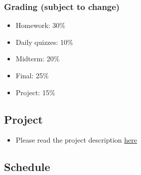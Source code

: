 \documentclass[
]{article}
\providecommand{\tightlist}{%
  \setlength{\itemsep}{0pt}\setlength{\parskip}{0pt}}
\begin{document}
\subsubsection*{Grading (subject to change)}\label{grading-subject-to-change}

\begin{itemize}
\tightlist
\item
  Homework: 30\%
\item
  Daily quizzes: 10\%
\item
  Midterm: 20\%
\item
  Final: 25\%
\item
  Project: 15\%
\end{itemize}

\subsection{Project}\label{project}

\begin{itemize}
\tightlist
\item
  Please read the project description \href{docs/project-description-ideas.pdf}{here}
\end{itemize}

\subsection*{Schedule}\label{schedule}
\end{document}
